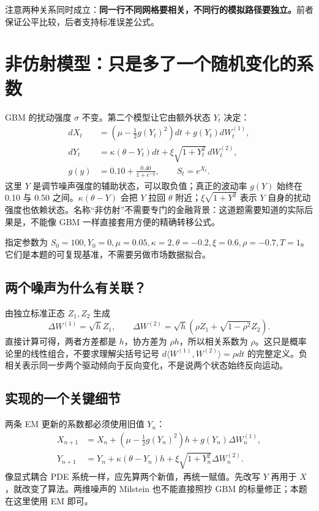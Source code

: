 \documentclass[11pt,a4paper,fontset=none]{ctexart}
\begin{document}
注意两种关系同时成立：\textbf{同一行不同网格要相关，不同行的模拟路径要独立。}前者保证公平比较，后者支持标准误差公式。

\newpage
\section{非仿射模型：只是多了一个随机变化的系数}\label{sec:nonaffine}
GBM 的扰动强度 $\sigma$ 不变。第二个模型让它由额外状态 $Y_t$ 决定：
\begin{align}
dX_t&=(\mu-\tfrac12g(Y_t)^2)dt+g(Y_t)dW_t^{(1)},\\
dY_t&=\kappa(\theta-Y_t)dt+\xi\sqrt{1+Y_t^2}\,dW_t^{(2)},\\
g(y)&=0.10+\frac{0.40}{1+e^{-y}},\qquad S_t=e^{X_t}.
\end{align}
这里 $Y$ 是调节噪声强度的辅助状态，可以取负值；真正的波动率 $g(Y)$ 始终在 0.10 与 0.50 之间。$\kappa(\theta-Y)$ 会把 $Y$ 拉回 $\theta$ 附近；$\xi\sqrt{1+Y^2}$ 表示 $Y$ 自身的扰动强度也依赖状态。名称“非仿射”不需要专门的金融背景：这道题需要知道的实际后果是，不能像 GBM 一样直接套用方便的精确转移公式。

指定参数为 $S_0=100,Y_0=0,\mu=0.05,\kappa=2,\theta=-0.2,\xi=0.6,\rho=-0.7,T=1$。它们是本题的可复现基准，不需要另做市场数据拟合。

\subsection*{两个噪声为什么有关联？}
由独立标准正态 $Z_1,Z_2$ 生成
\[
\Delta W^{(1)}=\sqrt h Z_1,\qquad
\Delta W^{(2)}=\sqrt h(\rho Z_1+\sqrt{1-\rho^2}Z_2).
\]
直接计算可得，两者方差都是 $h$，协方差为 $\rho h$，所以相关系数为 $\rho$。这只是概率论里的线性组合，不要求理解尖括号记号 $d\langle W^{(1)},W^{(2)}\rangle=\rho dt$ 的完整定义。负相关表示同一步两个驱动倾向于反向变化，不是说两个状态始终反向运动。

\subsection*{实现的一个关键细节}
两条 EM 更新的系数都必须使用旧值 $Y_n$：
\begin{align}
X_{n+1}&=X_n+(\mu-\tfrac12g(Y_n)^2)h+g(Y_n)\Delta W_n^{(1)},\\
Y_{n+1}&=Y_n+\kappa(\theta-Y_n)h+\xi\sqrt{1+Y_n^2}\Delta W_n^{(2)}.
\end{align}
像显式耦合 PDE 系统一样，应先算两个新值，再统一赋值。先改写 $Y$ 再用于 $X$，就改变了算法。两维噪声的 Milstein 也不能直接照抄 GBM 的标量修正；本题在这里使用 EM 即可。
\end{document}
